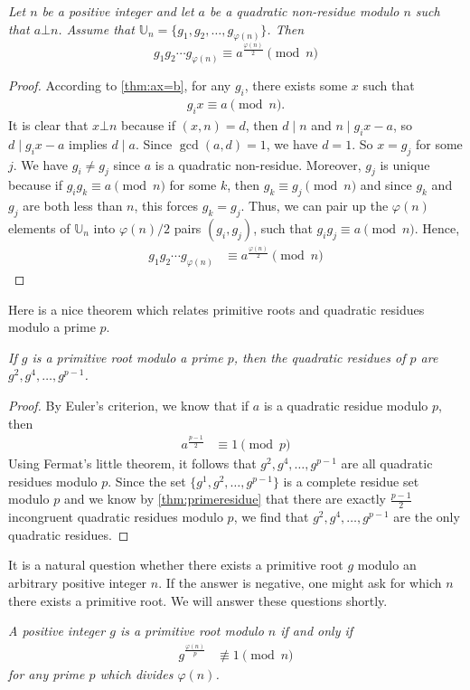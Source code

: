 \documentclass{subfile}
\begin{document}
	\begin{theorem}\slshape\label{prd}
		Let $n$ be a positive integer and let $a$ be a quadratic non-residue modulo $n$ such that $a\bot n$. Assume that $\mathbb U_n = \{g_1, g_2, \ldots, g_{\varphi(n)}\}$. Then
		\[g_1g_2\cdots g_{\varphi(n)}\equiv a^{\frac{\varphi(n)}{2}}\pmod n\]
	\end{theorem}

	\begin{proof}
		According to \autoref{thm:ax=b}, for any $g_i$, there exists some $x$ such that
			\begin{align}
				g_i x\equiv a\pmod n.
			\end{align}
		It is clear that $x \bot n$ because if $(x,n)=d$, then $d\mid n$ and $n\mid g_{i}x-a$, so $d\mid g_ix-a$ implies $d\mid a$. Since $\gcd(a,d)=1$, we have $d=1$. So $x=g_j$ for some $j$. We have $g_i \neq g_j$ since $a$ is a quadratic non-residue. Moreover, $g_j$ is unique because if $g_ig_k \equiv a \pmod n$ for some $k$, then $g_k \equiv g_j \pmod n$ and since $g_k$ and $g_j$ are both less than $n$, this forces $g_k=g_j$. Thus, we can pair up the $\varphi(n)$ elements of $\mathbb{U}_n$ into $\varphi(n)/2$ pairs $(g_i, g_j)$, such that $g_ig_j \equiv a \pmod n$. Hence,
			\begin{align*}
				g_1g_2\cdots g_{\varphi(n)}
					& \equiv a^{\frac{\varphi(n)}{2}}\pmod n
			\end{align*}
	\end{proof}
Here is a nice theorem which relates primitive roots and quadratic residues modulo a prime $p$.
	\begin{theorem}\slshape\label{thm:pr+qr}
		If $g$ is a primitive root modulo a prime $p$, then the quadratic residues of $p$ are $g^2,g^4,\ldots,g^{p-1}$.
	\end{theorem}

	\begin{proof}
		By Euler's criterion, we know that if $a$ is a quadratic residue modulo $p$, then
			\begin{align*}
				a^{\frac{p-1}{2}}
					& \equiv 1 \pmod p
			\end{align*}
		Using Fermat's little theorem, it follows that $g^2,g^4,\ldots,g^{p-1}$ are all quadratic residues modulo $p$. Since the set $\{g^1,g^2,\ldots,g^{p-1}\}$ is a complete residue set modulo $p$ and we know by \autoref{thm:primeresidue} that there are exactly $\frac{p-1}{2}$ incongruent quadratic residues modulo $p$, we find that $g^2,g^4,\ldots,g^{p-1}$ are the only quadratic residues.
	\end{proof}
It is a natural question whether there exists a primitive root $g$ modulo an arbitrary positive integer $n$. If the answer is negative, one might ask for which $n$ there exists a primitive root. We will answer these questions shortly.
	\begin{theorem}\slshape\label{thm:prTest}
		A positive integer $g$ is a primitive root modulo $n$ if and only if
			\begin{align*}
				g^{\frac{\varphi(n)}{p}}
					& \not\equiv1\pmod n
			\end{align*}
		for any prime $p$ which divides $\varphi(n)$.
	\end{theorem}
\end{document}
